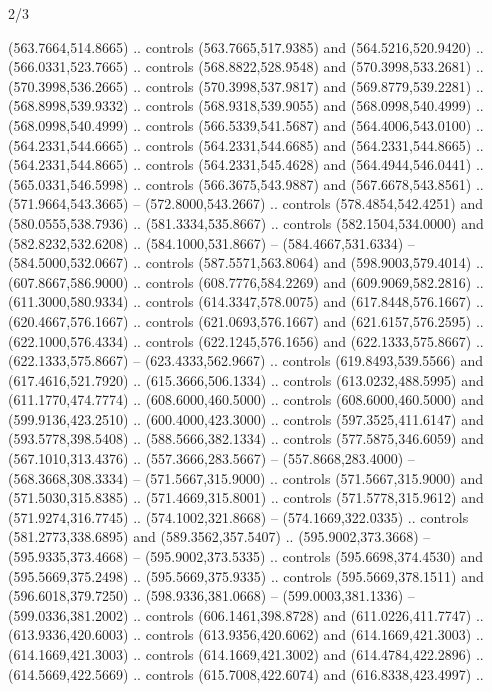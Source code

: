 \begin{flagdescription}{2/3}
\begin{scope}[xshift=0.5\flaglength,yshift=0.5\flagwidth,scale=\flagwidth/525.28]
\begin{scope}[y=0.1mm, x=0.1mm, yscale=-1,shift={(-381.5,-404)}]
\begin{scope}[shift={(5.25001,4.53053)},miter limit=4.00,line width=0.800\lw]
  (563.7664,514.8665) .. controls (563.7665,517.9385) and (564.5216,520.9420) ..
  (566.0331,523.7665) .. controls (568.8822,528.9548) and (570.3998,533.2681) ..
  (570.3998,536.2665) .. controls (570.3998,537.9817) and (569.8779,539.2281) ..
  (568.8998,539.9332) .. controls (568.9318,539.9055) and (568.0998,540.4999) ..
  (568.0998,540.4999) .. controls (566.5339,541.5687) and (564.4006,543.0100) ..
  (564.2331,544.6665) .. controls (564.2331,544.6685) and (564.2331,544.8665) ..
  (564.2331,544.8665) .. controls (564.2331,545.4628) and (564.4944,546.0441) ..
  (565.0331,546.5998) .. controls (566.3675,543.9887) and (567.6678,543.8561) ..
  (571.9664,543.3665) -- (572.8000,543.2667) .. controls (578.4854,542.4251) and
  (580.0555,538.7936) .. (581.3334,535.8667) .. controls (582.1504,534.0000) and
  (582.8232,532.6208) .. (584.1000,531.8667) -- (584.4667,531.6334) --
  (584.5000,532.0667) .. controls (587.5571,563.8064) and (598.9003,579.4014) ..
  (607.8667,586.9000) .. controls (608.7776,584.2269) and (609.9069,582.2816) ..
  (611.3000,580.9334) .. controls (614.3347,578.0075) and (617.8448,576.1667) ..
  (620.4667,576.1667) .. controls (621.0693,576.1667) and (621.6157,576.2595) ..
  (622.1000,576.4334) .. controls (622.1245,576.1656) and (622.1333,575.8667) ..
  (622.1333,575.8667) -- (623.4333,562.9667) .. controls (619.8493,539.5566) and
  (617.4616,521.7920) .. (615.3666,506.1334) .. controls (613.0232,488.5995) and
  (611.1770,474.7774) .. (608.6000,460.5000) .. controls (608.6000,460.5000) and
  (599.9136,423.2510) .. (600.4000,423.3000) .. controls (597.3525,411.6147) and
  (593.5778,398.5408) .. (588.5666,382.1334) .. controls (577.5875,346.6059) and
  (567.1010,313.4376) .. (557.3666,283.5667) -- (557.8668,283.4000) --
  (568.3668,308.3334) -- (571.5667,315.9000) .. controls (571.5667,315.9000) and
  (571.5030,315.8385) .. (571.4669,315.8001) .. controls (571.5778,315.9612) and
  (571.9274,316.7745) .. (574.1002,321.8668) -- (574.1669,322.0335) .. controls
  (581.2773,338.6895) and (589.3562,357.5407) .. (595.9002,373.3668) --
  (595.9335,373.4668) -- (595.9002,373.5335) .. controls (595.6698,374.4530) and
  (595.5669,375.2498) .. (595.5669,375.9335) .. controls (595.5669,378.1511) and
  (596.6018,379.7250) .. (598.9336,381.0668) -- (599.0003,381.1336) --
  (599.0336,381.2002) .. controls (606.1461,398.8728) and (611.0226,411.7747) ..
  (613.9336,420.6003) .. controls (613.9356,420.6062) and (614.1669,421.3003) ..
  (614.1669,421.3003) .. controls (614.1669,421.3002) and (614.4784,422.2896) ..
  (614.5669,422.5669) .. controls (615.7008,422.6074) and (616.8338,423.4997) ..

\end{scope}
\end{scope}
\end{scope}
\end{flagdescription}

